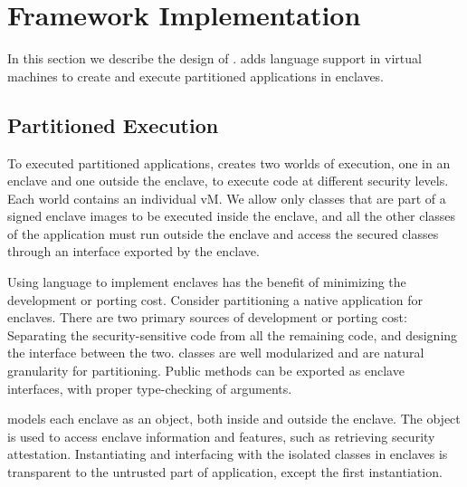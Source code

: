 \section{Framework Implementation}
\label{sec:implementation}

In this section we describe the design of \sysname{}.
\sysname{} adds language support in \java{} virtual machines to
create and execute partitioned applications in enclaves.

\subsection{Partitioned \java{} Execution}

To executed partitioned applications,
\sysname{} creates two worlds of \java{} execution,
one in an enclave and one outside the enclave,
to execute code at different security levels.
Each world contains an individual \java{} vM.
We allow only classes that are part of a signed enclave images to
be executed inside the enclave,
and all the other classes of the application
must run outside the enclave and access the secured classes through
an interface exported by the enclave.

Using \java{} language to implement enclaves
has the benefit of minimizing the development or porting cost.
Consider partitioning a native application for enclaves.
There are two primary sources of development or porting cost:
Separating the security-sensitive code from all the remaining code,
and designing the interface between the two.
\java{} classes are well modularized and are natural granularity for partitioning.
Public methods can be exported as
enclave interfaces, with proper type-checking of arguments.

\sysname{} models each enclave as an object,
both inside and outside the enclave.
The object is used to access enclave information and features,
such as retrieving security attestation.
Instantiating and interfacing with the isolated classes
in enclaves is transparent to the untrusted part of application,
except the first instantiation.


